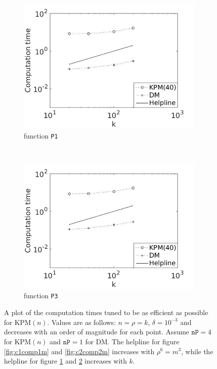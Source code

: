 \begin{figure}[H]
        \begin{subfigure}[b]{0.45\textwidth}
                \includegraphics[width=\textwidth]{fig/c3comp1k}
                \caption{function \texttt{P1}}
                \label{fig:c3comp1k}
        \end{subfigure}%
        ~
        \begin{subfigure}[b]{0.45\textwidth}
                \includegraphics[width=\textwidth]{fig/c4comp2k}
                \caption{function \texttt{P3}}
                \label{fig:c4comp2k}
        \end{subfigure}
        \caption{A plot of the computation times tuned to be as efficient as possible for KPM$(n)$. Values are as follows: $n = \rho = k$, $\delta = 10^{-3}$ and decreases with an order of magnitude for each point. Assume $\texttt{nP} = 4$ for KPM$(n)$ and $\texttt{nP} = 1$ for DM. The helpline for figure \ref{fig:c1comp1m} and \ref{fig:c2comp2m} increases with $\rho^6 = m^3$, while the helpline for figure \ref{fig:c3comp1k} and \ref{fig:c4comp2k} increases with $k$.}\label{fig:comp}
        
\end{figure}
